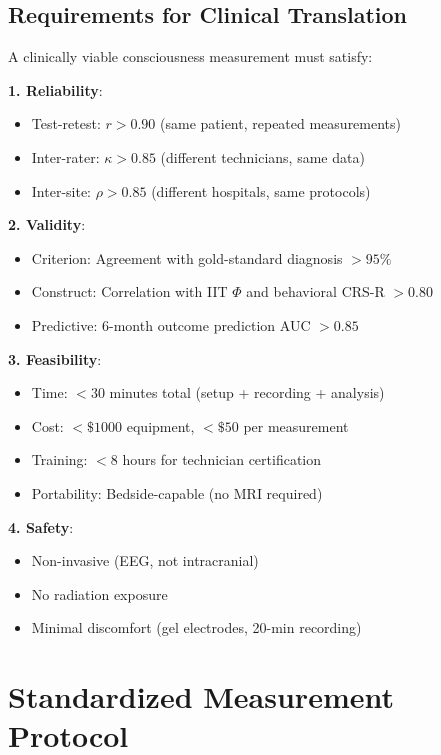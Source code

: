 \subsection{Requirements for Clinical Translation}

\begin{defn}\label{def:measurement-standards}
A clinically viable consciousness measurement must satisfy:

\textbf{1. Reliability}:
\begin{itemize}
\item Test-retest: $r > 0.90$ (same patient, repeated measurements)
\item Inter-rater: $\kappa > 0.85$ (different technicians, same data)
\item Inter-site: $\rho > 0.85$ (different hospitals, same protocols)
\end{itemize}

\textbf{2. Validity}:
\begin{itemize}
\item Criterion: Agreement with gold-standard diagnosis $> 95\%$
\item Construct: Correlation with IIT $\Phi$ and behavioral CRS-R $> 0.80$
\item Predictive: 6-month outcome prediction AUC $> 0.85$
\end{itemize}

\textbf{3. Feasibility}:
\begin{itemize}
\item Time: $< 30$ minutes total (setup + recording + analysis)
\item Cost: $< \$1000$ equipment, $< \$50$ per measurement
\item Training: $< 8$ hours for technician certification
\item Portability: Bedside-capable (no MRI required)
\end{itemize}

\textbf{4. Safety}:
\begin{itemize}
\item Non-invasive (EEG, not intracranial)
\item No radiation exposure
\item Minimal discomfort (gel electrodes, 20-min recording)
\end{itemize}
\end{defn}

\section{Standardized Measurement Protocol}

